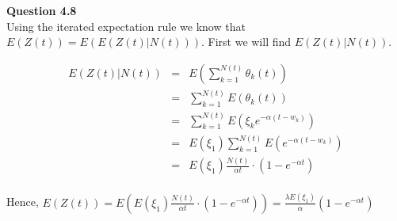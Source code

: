 \documentclass[10pt,a4paper]{article}
\begin{document}
\begin{flushleft}
\textbf{Question 4.8}\\

Using the iterated expectation rule we know that
$E(Z(t))=E(E(Z(t)|N(t)))$. First we will find $E(Z(t)|N(t))$.

\begin{eqnarray*}
E(Z(t)|N(t))&=& E(\sum_{k=1}^{N(t)} \theta_k (t)) \\
&=& \sum_{k=1}^{N(t)} E(\theta_k (t)) \\
&=& \sum_{k=1}^{N(t)} E(\xi_k e^{-\alpha (t-w_k)}) \\
&=& E(\xi_1) \sum_{k=1}^{N(t)} E(e^{-\alpha (t-w_k)}) \\
&=& E(\xi_1) \frac{N(t)}{\alpha t} \cdot (1-e^{-\alpha t}) \\
\end{eqnarray*}

Hence, $E(Z(t))=E( E(\xi_1) \frac{N(t)}{\alpha t} \cdot
(1-e^{-\alpha t}) )=\frac{\lambda  E(\xi_1)}{\alpha }
(1-e^{-\alpha t}) $

\begin{eqnarray*}
\\
\end{eqnarray*}

\end{flushleft}
\end{document}
